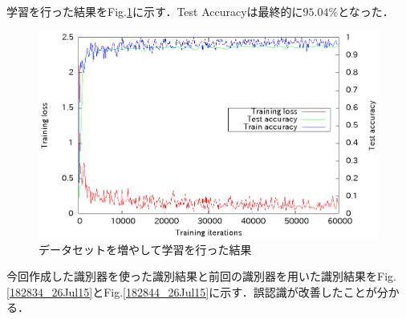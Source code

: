 \documentclass[a4paper,10pt]{jsarticle}
\begin{document}
学習を行った結果をFig.\ref{181752_26Jul15}に示す．Test Accuracyは最終的に$95.04\%$となった．
\begin{figure}[tb]
  \begin{center}
    \includegraphics[clip,width=12cm]{./fig/eps/result_train_test_lovelive_full.eps}
  \end{center}
  \caption{データセットを増やして学習を行った結果}
  \label{181752_26Jul15}
\end{figure}


今回作成した識別器を使った識別結果と前回の識別器を用いた識別結果をFig.\ref{182834_26Jul15}とFig.\ref{182844_26Jul15}に示す．誤認識が改善したことが分かる．
\end{document}
